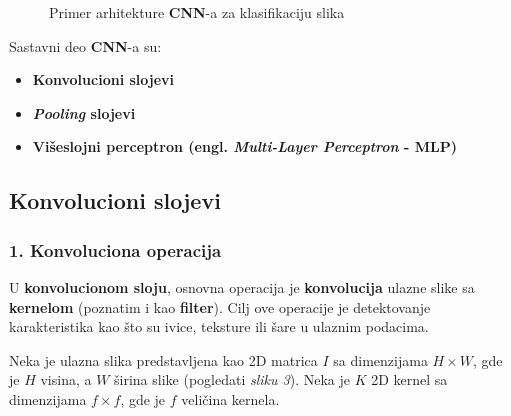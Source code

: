 \documentclass[12pt]{article}
\begin{document}
     \begin{figure}[h!]
      \centering
      \caption{Primer arhitekture \textbf{CNN}-a za klasifikaciju slika}
      \label{fig:cnn_architecture}
    \end{figure}
    
    \vspace{0.7cm}
   
    Sastavni deo \textbf{CNN}-a su:
    \begin{itemize}
      \vspace{-0.5cm}
      \setlength\itemsep{0em}
      \item \textbf{Konvolucioni slojevi}
      \item \textbf{\textit{Pooling} slojevi}
      \item \textbf{Višeslojni perceptron (engl. \textbf{\textit{Multi-Layer Perceptron}} - \textbf{MLP})}
   \end{itemize}

   \newpage

   \subsection*{Konvolucioni slojevi}
   \subsubsection*{1. Konvoluciona operacija}
   U \textbf{konvolucionom sloju}, osnovna operacija je \textbf{konvolucija} ulazne slike sa \textbf{kernelom} (poznatim i kao \textbf{filter}).
   Cilj ove operacije je detektovanje karakteristika kao što su ivice, teksture 
   ili šare u ulaznim podacima.

   Neka je ulazna slika predstavljena kao 2D matrica \( I \) 
   sa dimenzijama \( H \times W \), gde je \( H \) visina, 
   a \( W \) širina slike (pogledati \textit{sliku 3}). Neka je \( K \) 2D kernel sa 
   dimenzijama \( f \times f \), gde je \( f \) veličina kernela.
   
\end{document}
